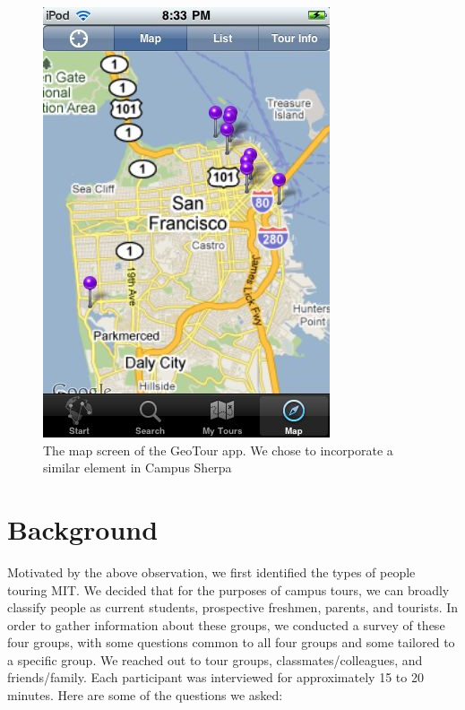 \documentclass{sigchi}
\begin{document}
\begin{figure}[h!]
\centering
\includegraphics[width=1.0\linewidth]{./GeoTour}
\caption{The map screen of the GeoTour app. We chose to incorporate a similar element in Campus Sherpa}
\label{fig:GeoTour}
\end{figure}

\section{Background}

Motivated by the above observation, we first identified the types of people touring MIT. We decided that for the purposes of campus tours, we can broadly classify people as current students, prospective freshmen, parents, and tourists. In order to gather information about these groups, we conducted a survey of these four groups, with some questions common to all four groups and some tailored to a specific group. We reached out to tour groups, classmates/colleagues, and friends/family. Each participant was interviewed for approximately 15 to 20 minutes. Here are some of the questions we asked:
\end{document}
